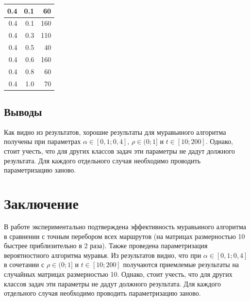 \documentclass[a4paper,12pt]{article}
\begin{document}
\begin{table} [h!]
\begin{center}
\begin{tabular}{|r|r|r|}
\hline
       0.4 &        0.1 &         60 \\
\hline
       0.4 &        0.1 &        160 \\
\hline
       0.4 &        0.3 &        110 \\
\hline
       0.4 &        0.5 &         40 \\
\hline
       0.4 &        0.6 &        160 \\
\hline
       0.4 &        0.8 &         60 \\
\hline
       0.4 &        1.0 &         70 \\
\hline
\end{tabular}    
\label{param2}
\end{center}
\end{table} 



\subsection*{Выводы}

Как видно из результатов, хорошие результаты для муравьиного алгоритма получены при параметрах $\alpha \in [0,1; 0,4]$, $\rho \in (0; 1]$ и 
 $\textit{t} \in [10; 200]$. Однако,
 стоит учесть, что для других классов задач
 эти параметры не дадут должного результата. Для
 каждого отдельного случая необходимо проводить
 параметризацию заново.

\newpage
\section*{Заключение}

В работе экспериментально подтверждена эффективность
муравьиного алгоритма в сравнении с точным перебором
всех маршрутов (на матрицах размерностью 10 быстрее приблизительно в 2 раза). Также проведена параметризация вероятностного
алгоритма муравья. Из результатов видно, что
при $\alpha \in [0,1; 0,4]$ в сочетании с $\rho \in (0; 1]$ и 
 $\textit{t} \in [10; 200]$ получаются
 приемлемые результаты на случайных матрицах размерностью 10. Однако,
 стоит учесть, что для других классов задач
 эти параметры не дадут должного результата. Для
 каждого отдельного случая необходимо проводить
 параметризацию заново.
\end{document}
